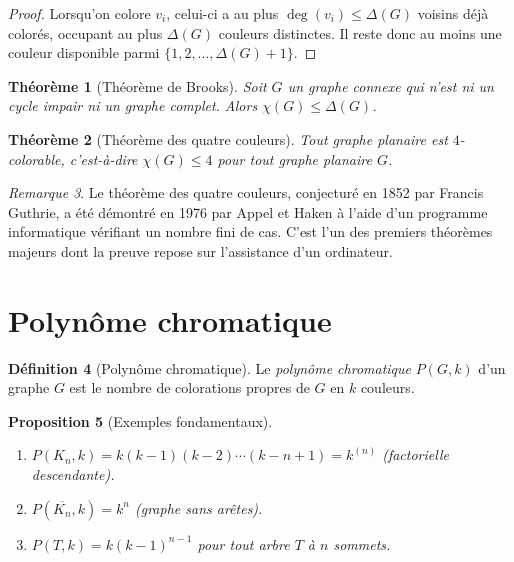 \documentclass[12pt,a4paper,openany]{book}
\theoremstyle{definition}
\newtheorem{definition}{Définition}[chapter]
\theoremstyle{plain}
\newtheorem{theoreme}[definition]{Théorème}
\newtheorem{proposition}[definition]{Proposition}
\theoremstyle{remark}
\newtheorem{remarque}[definition]{Remarque}
\begin{document}
\begin{proof}
Lorsqu'on colore $v_i$, celui-ci a au plus $\deg(v_i) \leq \Delta(G)$
voisins déjà colorés, occupant au plus $\Delta(G)$ couleurs distinctes.
Il reste donc au moins une couleur disponible parmi
$\{1, 2, \dots, \Delta(G)+1\}$.
\end{proof}

\begin{theoreme}[Théorème de Brooks]
\label{thm:brooks}
Soit $G$ un graphe connexe qui n'est ni un cycle impair ni un graphe
complet. Alors $\chi(G) \leq \Delta(G)$.
\end{theoreme}

\begin{theoreme}[Théorème des quatre couleurs]
\label{thm:quatre-couleurs}
Tout graphe planaire est $4$-colorable, c'est-à-dire $\chi(G) \leq 4$
pour tout graphe planaire $G$.
\end{theoreme}

\begin{remarque}
Le théorème des quatre couleurs, conjecturé en 1852 par Francis Guthrie,
a été démontré en 1976 par Appel et Haken à l'aide d'un programme
informatique vérifiant un nombre fini de cas. C'est l'un des premiers
théorèmes majeurs dont la preuve repose sur l'assistance d'un ordinateur.
\end{remarque}

\section{Polynôme chromatique}
\label{sec:polynome-chromatique}

\begin{definition}[Polynôme chromatique]
\label{def:polynome-chromatique}
Le \emph{polynôme chromatique} $P(G, k)$ d'un graphe $G$ est le nombre
de colorations propres de $G$ en $k$ couleurs.
\end{definition}

\begin{proposition}[Exemples fondamentaux]
\label{prop:polynome-exemples}
\begin{enumerate}[label=(\roman*)]
  \item $P(K_n, k) = k(k-1)(k-2)\cdots(k-n+1) = k^{(n)}$ (factorielle
        descendante).
  \item $P(\overline{K_n}, k) = k^n$ (graphe sans arêtes).
  \item $P(T, k) = k(k-1)^{n-1}$ pour tout arbre $T$ à $n$ sommets.
\end{enumerate}
\end{proposition}
\end{document}
